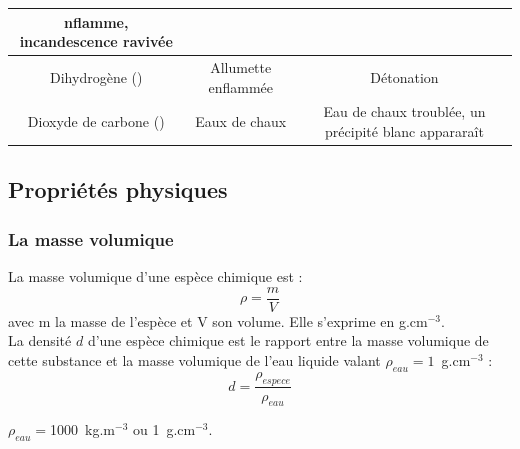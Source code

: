 \begin{tcolorbox}[colback=red!5!white,colframe=red!75!black,title=\textbf{Tests chimiques à connaître : }]
\begin{tabular}{|C{0.31}|C{0.3}|C{0.31}|}
nflamme, incandescence ravivée \\
    \hline
    Dihydrogène () & Allumette enflammée  &  Détonation \\
    \hline 
    Dioxyde de carbone () & Eaux de chaux & Eau de chaux troublée, un précipité blanc appararaît \\
    \hline
    \end{tabular}
\end{tcolorbox} 

\subsection{Propriétés physiques}
\subsubsection{La masse volumique}
\begin{tcolorbox}[colback=green!5!white,colframe=green!75!black,title=\textbf{Rappel : masse volumique et densité }]
La masse volumique d'une espèce chimique est :
\begin{equation*}
    \rho = \frac{m}{V}
\end{equation*}
avec m la masse de l'espèce et V son volume. Elle s'exprime en g.cm$^{-3}$.\\
La densité $d$ d'une espèce chimique est le rapport entre la masse volumique de cette substance et la masse volumique de l'eau liquide valant $\rho_{eau}=1$~g.cm$^{-3}$ :
\begin{equation*}
    d = \frac{\rho_{espece}}{\rho_{eau}}
\end{equation*}
\end{tcolorbox}

\begin{tcolorbox}[colback=red!5!white,colframe=red!75!black,title=\textbf{Masse volumique de l'eau: }]
\begin{center}
    $\rho_{eau} = $1000~kg.m$^{-3}$ ou 1~g.cm$^{-3}$. 
\end{center}
\end{tcolorbox}

